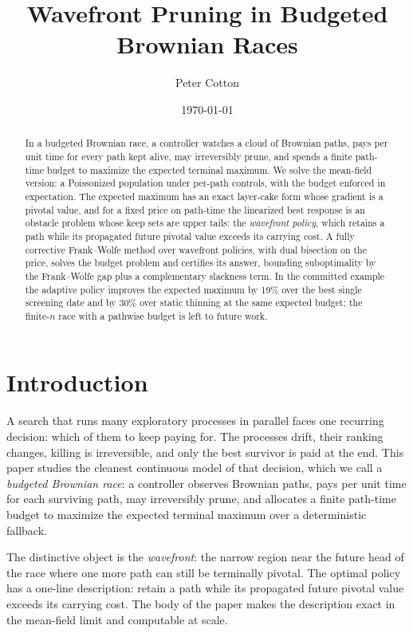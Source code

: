 \documentclass[11pt]{article}
\title{\textbf{Wavefront Pruning in Budgeted Brownian Races}}
\author{Peter Cotton}
\date{\today}
\theoremstyle{itheads}
\begin{document}
\maketitle

\begin{abstract}
\noindent In a budgeted Brownian race, a controller watches a cloud of
Brownian paths, pays per unit time for every path kept alive, may
irreversibly prune, and spends a finite path-time budget to maximize the
expected terminal maximum. We solve the mean-field version: a Poissonized
population under per-path controls, with the budget enforced in
expectation. The expected maximum has an exact layer-cake form whose
gradient is a pivotal value, and for a fixed price on path-time the
linearized best response is an obstacle problem whose keep sets are upper
tails: the \emph{wavefront policy}, which retains a path while its
propagated future pivotal value exceeds its carrying cost. A fully
corrective Frank--Wolfe method over wavefront policies, with dual
bisection on the price, solves the budget problem and certifies its
answer, bounding suboptimality by the Frank--Wolfe gap plus a
complementary slackness term. In the committed example the adaptive
policy improves the expected maximum by 19\% over the best single
screening date and by 30\% over static thinning at the same expected
budget; the finite-$n$ race with a pathwise budget is left to future
work.
\end{abstract}

\section{Introduction}

A search that runs many exploratory processes in parallel faces one
recurring decision: which of them to keep paying for. The processes drift,
their ranking changes, killing is irreversible, and only the best survivor
is paid at the end. This paper studies the cleanest continuous model of
that decision, which we call a \emph{budgeted Brownian race}: a controller
observes Brownian paths, pays per unit time for each surviving path, may
irreversibly prune, and allocates a finite path-time budget to maximize
the expected terminal maximum over a deterministic fallback.

The distinctive object is the \emph{wavefront}: the narrow region near the
future head of the race where one more path can still be terminally
pivotal. The optimal policy has a one-line description: retain a path
while its propagated future pivotal value exceeds its carrying cost. The
body of the paper makes the description exact in the mean-field limit and
computable at scale.
\end{document}

